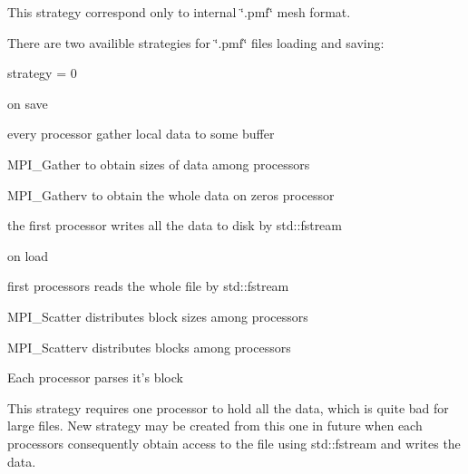 This strategy correspond only to internal \char`\"{}.\-pmf\char`\"{} mesh format. 

There are two availible strategies for \char`\"{}.\-pmf\char`\"{} files loading and saving\-:

strategy = 0
\begin{DoxyItemize}
\item on save
\begin{DoxyEnumerate}
\item every processor gather local data to some buffer
\item M\-P\-I\-\_\-\-Gather to obtain sizes of data among processors
\item M\-P\-I\-\_\-\-Gatherv to obtain the whole data on zeros processor
\item the first processor writes all the data to disk by std\-::fstream
\end{DoxyEnumerate}
\item on load
\begin{DoxyEnumerate}
\item first processors reads the whole file by std\-::fstream
\item M\-P\-I\-\_\-\-Scatter distributes block sizes among processors
\item M\-P\-I\-\_\-\-Scatterv distributes blocks among processors
\item Each processor parses it's block
\end{DoxyEnumerate}
\end{DoxyItemize}

This strategy requires one processor to hold all the data, which is quite bad for large files. New strategy may be created from this one in future when each processors consequently obtain access to the file using std\-::fstream and writes the data.


